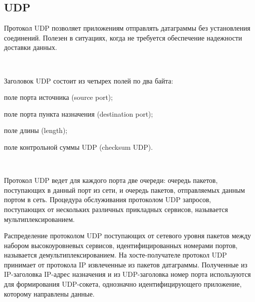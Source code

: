 \documentclass{article}
\begin{document}
\subsection{\textbf{UDP}}

Протокол UDP позволяет приложениям отправлять датаграммы без установления соединений. 
Полезен в ситуациях, когда не требуется обеспечение надежности доставки данных. 

~\

Заголовок UDP состоит из четырех полей по два байта:
\begin{compactitem}
\item  поле порта источника (source port);
\item поле порта пункта назначения (destination port);
\item поле длины (length);
\item поле контрольной суммы UDP (checksum UDP).
\end{compactitem}

~\

Протокол UDP ведет для каждого порта две очереди: очередь пакетов, поступающих в данный порт из сети, и очередь пакетов, отправляемых данным портом в сеть. 
Процедура обслуживания протоколом UDP запросов, поступающих от нескольких различных прикладных сервисов, называется мультиплексированием. 

Распределение протоколом UDP поступающих от сетевого уровня пакетов между набором высокоуровневых сервисов, идентифицированных номерами портов, называется демультиплексированием. На хосте-получателе протокол UDP принимает от протокола IP извлеченные из пакетов датаграммы. Полученные из IP-заголовка IP-адрес назначения и из UDP-заголовка номер порта используются для формирования UDP-сокета, однозначно идентифицирующего приложение, которому направлены данные. 
\begin{figure}[h]
\end{figure}
~\
\end{document}
